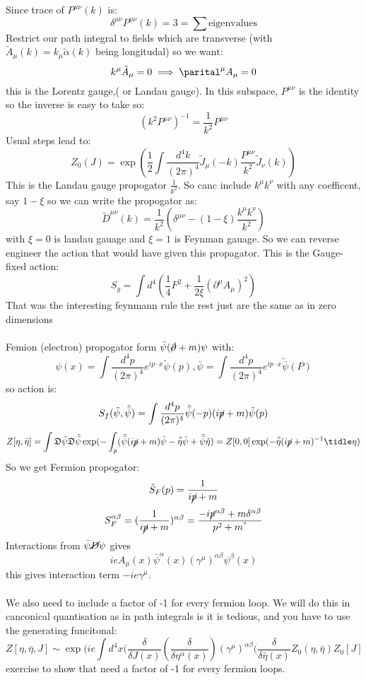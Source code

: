 \documentclass{article}
\begin{document}
       Since trace of $P^{\mu \nu} (k)$ is:
       $$
        \delta^{\mu \nu} P^{\mu \nu} (k) = 3 = \sum \text{eigenvalues}
       $$
       Restrict our path integral to fields which are transverse (with $\tilde A_{\mu}(k) = k_{\mu} \tilde \alpha(k)$ being longitudal) so we want:
       $$
        k^{\mu} \tilde A_{\mu} = 0 \implies \parital^{\mu} A_{\mu} = 0
       $$
       this is the Lorentz gauge,( or Landau gauge). In this subspace, $P^{\mu \nu}$ is the identity so the inverse is easy to take so:
       $$
       ( k^2 P^{\mu \nu} )^{-1} = \frac{1}{k^2} P^{\mu \nu}
       $$
       Usual steps lead to:
       $$
       Z_0(J) = \exp( \frac{1}{2} \int \frac{d^4 k}{(2 \pi)^4} \tilde J_{\mu} (-k) \frac{P^{\mu \nu}}{k^2}\tilde J_{\nu} (k))
       $$
       This is the Landau gauge propogator $\frac{1}{k^2}$. So canc include $k^{\mu} k^{\nu}$ with any coefficent, say $1- \xi$ so we can write the propogator as:
       $$
       \tilde D^{\mu \nu} (k) = \frac{1}{k^2} ( \delta^{\mu \nu} - (1- \xi) \frac{k^{\mu} k^{\nu}}{k^2})
       $$
       with $\xi = 0$ is landau gauage and $\xi =1$ is Feynman gauage. So we can reverse engineer the action that would have given this propagator. This is the Gauge-fixed action:
       $$
       S_g = \int d^4 ( \frac{1}{4} F^2 + \frac{1}{2\xi} ( \partial^{\mu} A_{\mu})^2)
       $$
       That was the interesting feynmann rule the rest just are the same as in zero dimensions\\\\
       Femion (electron) propogator form $\bar \psi( \cancel \partial + m) \psi$ with:
       $$
       \psi(x) = \int \frac{d^4 p}{(2\pi)^4} e^{i p \cdot x} \tilde \psi(p), \bar \psi = \int \frac{d^4 p}{(2\pi)^4} e^{i p\cdot x} \tilde{\bar \psi}(P)
       $$
       so action is:
       $$
       S_f ( \tilde \psi, \tilde{\bar \psi}) = \int \frac{d^4 p}{(2\pi)^4} \tilde{\bar \psi} (-p) ( i \cancel p + m ) \tilde \psi (p)
       $$
       $$
        Z[ \eta, \bar \eta] = \int \mathfrak{D} \tilde \psi \mathfrak{D} \tilde{\bar \psi} \exp ( - \int_p ( \tilde{\bar \psi} ( i \cancel p + m) \tilde \psi - \tilde{\bar \eta} \tilde \psi + \tilde{\bar \psi} \tilde \eta) = Z[ 0,0] \exp( - \tilde{\bar \eta} ( i \cancel p + m)^{-1} \tidle \eta)
       $$
       So we get Fermion propogator:
       $$
        \tilde S_F (p) = \frac{1}{i \cancel p + m}
       $$
       $$
        S^{\alpha \beta}_F = ( \frac{1}{i \cancel p + m})^{\alpha \beta} = \frac{- i \cancel p^{\alpha \beta} + m \delta^{\alpha \beta}}{p^2 + m^"}
       $$
        Interactions from $\bar \psi \cancel D \psi$ gives 
        $$
        ie A_{\mu}(x) \bar \psi^{\alpha}( x) ( \gamma^{\mu})^{\alpha \beta} \psi^{\beta}( x)
        $$
        this gives interaction term $- ie \gamma^{\mu}$.\\\\
        We also need to include a factor of -1 for every fermion loop. We will do this in canconical quantisation as in path integrals is it is tedious, and you have to use the generating funcitonal:
        $$
         Z[\eta, \bar \eta, J] \sim \exp ( i e\int d^4 x ( \frac{\delta}{\delta J(x)} ( \frac{\delta}{\delta \eta^{\alpha}(x)}) ( \gamma^{\mu})^{\alpha \beta} ( \frac{\delta}{\delta \bar \eta(x)} Z_0 (\eta, \bar \eta) Z_0[J]
        $$
        exercise to show that need a factor of -1 for every fermion loops.
\end{document}
